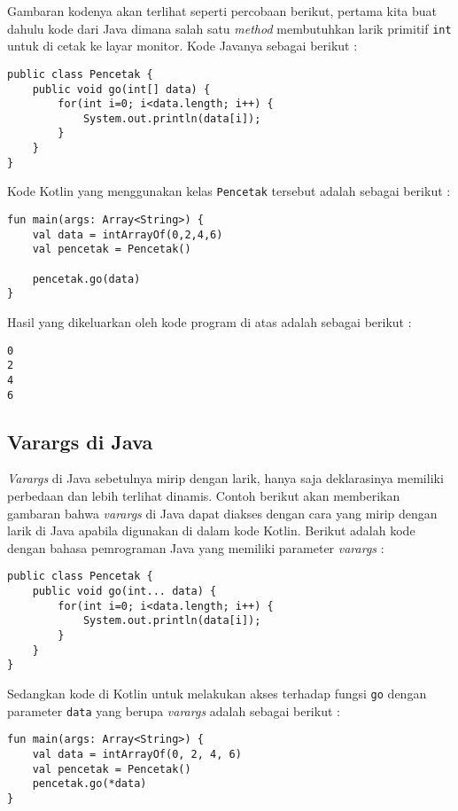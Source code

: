Gambaran kodenya akan terlihat seperti percobaan berikut, pertama kita buat dahulu kode dari Java dimana salah satu \textit{method} membutuhkan larik primitif \texttt{int} untuk di cetak ke layar monitor. Kode Javanya sebagai berikut :

\begin{lstlisting}
public class Pencetak {
	public void go(int[] data) {
		for(int i=0; i<data.length; i++) {
			System.out.println(data[i]);
		}
	}
}
\end{lstlisting}

Kode Kotlin yang menggunakan kelas \texttt{Pencetak} tersebut adalah sebagai berikut :

\begin{lstlisting}
fun main(args: Array<String>) {
	val data = intArrayOf(0,2,4,6)
	val pencetak = Pencetak()
	
	pencetak.go(data)
}
\end{lstlisting}

Hasil yang dikeluarkan oleh kode program di atas adalah sebagai berikut : 

\begin{lstlisting}
0
2
4
6
\end{lstlisting}

\subsection{Varargs di Java}

\textit{Varargs} di Java sebetulnya mirip dengan larik, hanya saja deklarasinya memiliki perbedaan dan lebih terlihat dinamis. Contoh berikut akan memberikan gambaran bahwa \textit{varargs} di Java dapat diakses dengan cara yang mirip dengan larik di Java apabila digunakan di dalam kode Kotlin. Berikut adalah kode dengan bahasa pemrograman Java yang memiliki parameter \textit{varargs} :

\begin{lstlisting}
public class Pencetak {
	public void go(int... data) {
		for(int i=0; i<data.length; i++) {
			System.out.println(data[i]);
		}
	}
}
\end{lstlisting}

Sedangkan kode di Kotlin untuk melakukan akses terhadap fungsi \texttt{go} dengan parameter \texttt{data} yang berupa \textit{varargs} adalah sebagai berikut :

\begin{lstlisting}
fun main(args: Array<String>) {
	val data = intArrayOf(0, 2, 4, 6)
	val pencetak = Pencetak()
	pencetak.go(*data)
}
\end{lstlisting}

